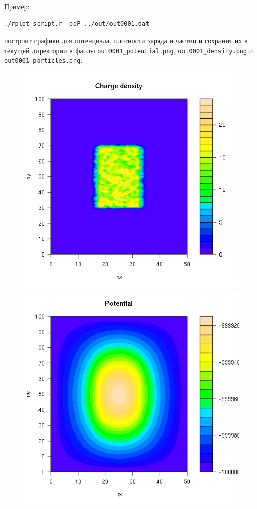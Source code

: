 Пример:
\begin{verbatim}
./rplot_script.r -pdP ../out/out0001.dat
\end{verbatim}
построит графики для потенциала, плотности заряда и частиц и 
сохранит их в текущей директории в фаилы \texttt{out0001\_potential.png}, 
\texttt{out0001\_density.png} и \texttt{out0001\_particles.png}.
\begin{figure}[h]
  \centering
  \includegraphics[scale=0.3]{./figs/out0001_density.png}
  \includegraphics[scale=0.3]{./figs/out0001_potential.png}

\end{figure}
